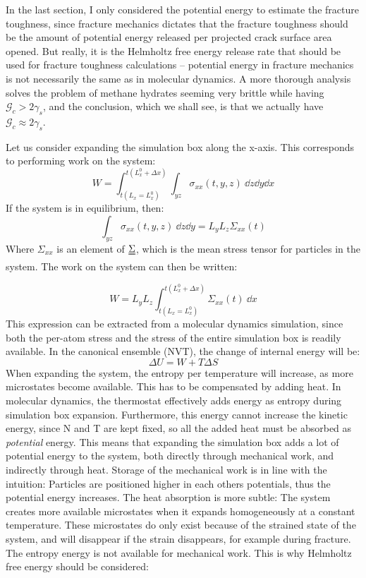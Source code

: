 In the last section, I only considered the potential energy to estimate the fracture toughness, since fracture mechanics dictates that the fracture toughness should be the amount of potential energy released per projected crack surface area opened. But really, it is the Helmholtz free energy release rate that should be used for fracture toughness calculations -- potential energy in fracture mechanics is not necessarily the same as in molecular dynamics. A more thorough analysis solves the problem of methane hydrates seeming very brittle while having $\mathcal{G}_c > 2\gamma_s$, and the conclusion, which we shall see, is that we actually have $\mathcal{G}_c \approx 2\gamma_s$.

Let us consider expanding the simulation box along the x-axis. This corresponds to performing work on the system:
%
\begin{equation}
	W = \int_{t(L_x = L_x^0)}^{t(L_x^0 + \Delta x)} \int_{yz} \sigma_{xx} (t, y, z) \ \dd z \dd y \dd x
\end{equation}
%
If the system is in equilibrium, then:
\begin{equation}
\int_{yz} \sigma_{xx} (t, y, z) \ \dd z \dd y = L_yL_z\Sigma_{xx}(t)	
\end{equation}
Where $\Sigma_{xx}$ is an element of $\uuline \Sigma$, which is the mean stress tensor for particles in the system. The work on the system can then be written:

\begin{equation}
	W = L_y L_z \int_{t(L_x = L_x^0)}^{t(L_x^0 + \Delta x)} \Sigma_{xx}(t) \ \dd x
	\label{eq:work_expansion}
\end{equation}
This expression can be extracted from a molecular dynamics simulation, since both the per-atom stress and the stress of the entire simulation box is readily available.
In the canonical ensemble (NVT), the change of internal energy will be:
\begin{equation}
	\Delta U = W + T\Delta S
\end{equation}
When expanding the system, the entropy per temperature will increase, as more microstates become available. This has to be compensated by adding heat. In molecular dynamics, the thermostat effectively adds energy as entropy during simulation box expansion. Furthermore, this energy cannot increase the kinetic energy, since N and T are kept fixed, so all the added heat must be absorbed as \emph{potential} energy. This means that expanding the simulation box adds a lot of potential energy to the system, both directly through mechanical work, and indirectly through heat. Storage of the mechanical work is in line with the intuition: Particles are positioned higher in each others potentials, thus the potential energy increases. The heat absorption is more subtle: The system creates more available microstates when it expands homogeneously at a constant temperature. These microstates do only exist because of the strained state of the system, and will disappear if the strain disappears, for example during fracture. The entropy energy is not available for mechanical work. This is why Helmholtz free energy should be considered:

